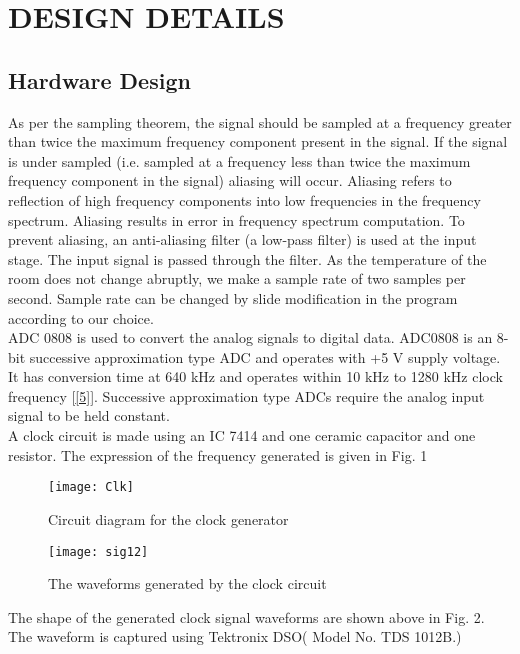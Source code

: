 \documentclass[10pt,a4paper]{article}
\begin{document}
\section{DESIGN DETAILS}
\subsection{Hardware Design}
As per the sampling theorem, the signal should be sampled at a frequency greater than twice the maximum frequency component present in the signal. If the signal is under sampled (i.e. sampled at a frequency less than twice the maximum frequency component in the signal) aliasing will occur. Aliasing refers to reflection of high frequency components into low frequencies in the frequency spectrum. Aliasing results in error in frequency spectrum computation. To prevent aliasing, an anti-aliasing filter (a low-pass filter) is used at the input stage. The input signal is passed through the filter. As the temperature of the room does not change abruptly, we make a sample rate of two samples per second. Sample rate can be changed by slide modification in the program according to our choice.\\

ADC 0808 is used to convert the analog signals to digital data. ADC0808 is an 8-bit successive approximation type ADC and operates with +5 V supply voltage. It has  conversion time at 640 kHz and operates within 10 kHz to 1280 kHz clock frequency [\ref{5}]. Successive approximation type ADCs require the analog input signal to be held constant.\\

A clock circuit is made using an IC 7414 and one ceramic capacitor and one resistor. The expression of the frequency generated is given in Fig. 1
\begin{center}

\end{center}
\begin{center}
\begin{figure}[!h]
\centering
\texttt{[image: Clk]}
\caption{Circuit diagram for the clock generator}
\end{figure}
\end{center}
\begin{figure}[!h]
\centering
\texttt{[image: sig12]}
\centering \caption{The waveforms generated by the clock circuit}
\end{figure}
The shape of the generated clock signal waveforms are shown above in Fig. 2. The waveform is captured using Tektronix DSO( Model No. TDS 1012B.)\\
\end{document}
